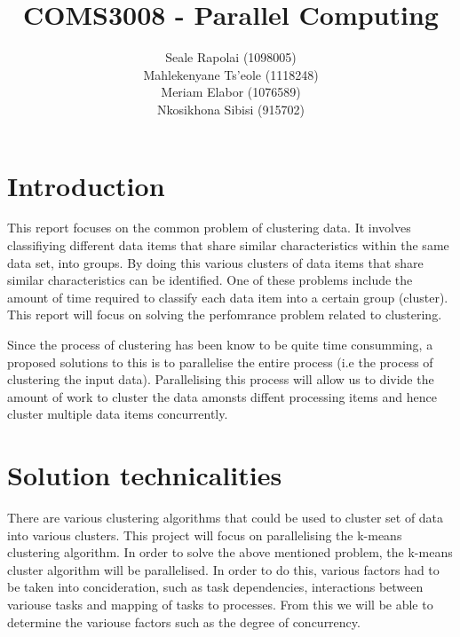 \documentclass[12pt]{article}
\begin{document}
	\title{COMS3008 - Parallel Computing}
	\author{Seale Rapolai (1098005)
          \\ Mahlekenyane Ts'eole (1118248)
          \\ Meriam Elabor (1076589)
          \\ Nkosikhona Sibisi (915702)
    }
	\maketitle

	\section{Introduction}
    	\begin{flushleft}
      		This report focuses on the common problem of clustering data. It involves classifiying different data items that share similar characteristics within the same data set, into groups. By doing this various clusters of data items that share similar characteristics can be identified. One of these problems include the amount of time required to classify each data item into a certain group (cluster). This report will focus on solving the perfomrance problem related to clustering.
    	\end{flushleft}

    	\begin{flushleft}
      		Since the process of clustering has been know to be quite time consumming, a proposed solutions to this is to parallelise the entire process (i.e the process of clustering the input data). Parallelising this process will allow us to divide the amount of work to cluster the data amonsts diffent processing items and hence cluster multiple data items concurrently.
    	\end{flushleft}

	\section{Solution technicalities}
  		\begin{flushleft}
			There are various clustering algorithms that could be used to cluster set of data into various clusters. This project will focus on parallelising the k-means clustering algorithm. In order to solve the above mentioned problem, the k-means cluster algorithm will be parallelised. In order to do this, various factors had to be taken into concideration, such as task dependencies, interactions between variouse tasks and mapping of tasks to processes. From this we will be able to determine the variouse factors such as the degree of concurrency.
    	\end{flushleft}
    	
\end{document}
